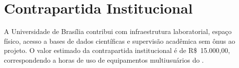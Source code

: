 \section{Contrapartida Institucional}

A Universidade de Brasília contribui com infraestrutura laboratorial,
espaço físico, acesso a bases de dados científicas e supervisão acadêmica
sem ônus ao projeto. O valor estimado da contrapartida institucional é
de R\$~15.000,00, correspondendo a horas de uso de equipamentos
multiusuários do .
